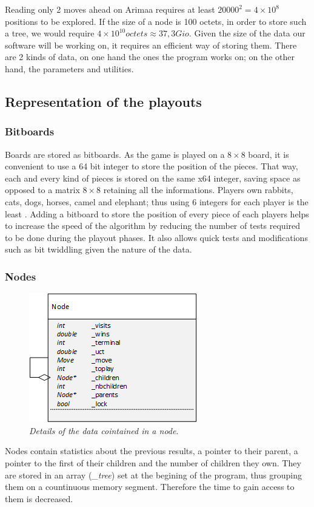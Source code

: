 Reading only 2 moves ahead on Arimaa requires at least \ensuremath{20 000^2 = 4 \times 10^8} positions to be explored. If the size of a node is 100 octets, in order to store such a tree, we would require \ensuremath{4\times10^{10} octets \approx 37,3 Gio}. Given the size of the data our software will be working on, it requires an efficient way of storing them. There are 2 kinds of data, on one hand the ones the program works on; on the other hand, the parameters and utilities.
\subsection{Representation of the playouts}
\subsubsection{Bitboards}
Boards are stored as bitboards. As the game is played on a \ensuremath{8\times8} board, it is convenient to use a 64 bit integer to store the position of the pieces. That way, each and every kind of pieces is stored on the same x64 integer, saving space as opposed to a matrix \ensuremath{8\times8} retaining all the informations. Players own rabbits, cats, dogs, horses, camel and elephant; thus using 6 integers for each player is the least . Adding a bitboard to store the position of every piece of each players helps to increase the speed of the algorithm by reducing the number of tests required to be done during the playout phases. It also allows quick tests and modifications such as bit twiddling given the nature of the data.

\subsubsection{Nodes}
\begin{figure}[H] 
\centerline{\includegraphics[scale=0.8]{Data_Structure/Img/Node.png}}
\caption{\label{fig:nodedetails}\textit{Details of the data cointained in a node}.}
\end{figure}
Nodes contain statistics about the previous results, a pointer to their parent, a pointer to the first of their children and the number of children they own. They are stored in an array (\textit{\_tree}) set at the begining of the program, thus grouping them on a countinuous memory segment. Therefore the time to gain access to them is decreased.

